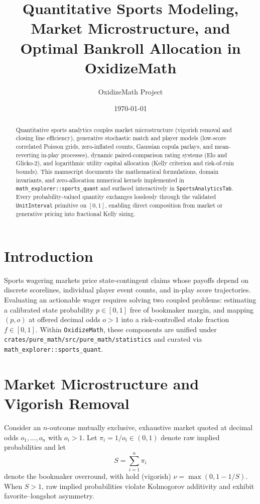 \documentclass{article}
\title{Quantitative Sports Modeling, Market Microstructure, and Optimal Bankroll Allocation in OxidizeMath}
\author{OxidizeMath Project}
\date{\today}
\begin{document}
\maketitle

\begin{abstract}
Quantitative sports analytics couples market microstructure (vigorish removal and closing line efficiency), generative stochastic match and player models (low-score correlated Poisson grids, zero-inflated counts, Gaussian copula parlays, and mean-reverting in-play processes), dynamic paired-comparison rating systems (Elo and Glicko-2), and logarithmic utility capital allocation (Kelly criterion and risk-of-ruin bounds). This manuscript documents the mathematical formulations, domain invariants, and zero-allocation numerical kernels implemented in \texttt{math\_explorer::sports\_quant} and surfaced interactively in \texttt{SportsAnalyticsTab}. Every probability-valued quantity exchanges losslessly through the validated \texttt{UnitInterval} primitive on $[0, 1]$, enabling direct composition from market or generative pricing into fractional Kelly sizing.
\end{abstract}

\section{Introduction}
Sports wagering markets price state-contingent claims whose payoffs depend on discrete scorelines, individual player event counts, and in-play score trajectories. Evaluating an actionable wager requires solving two coupled problems: estimating a calibrated state probability $p \in [0, 1]$ free of bookmaker margin, and mapping $(p, o)$ at offered decimal odds $o > 1$ into a risk-controlled stake fraction $f \in [0, 1]$. Within \texttt{OxidizeMath}, these components are unified under \texttt{crates/pure\_math/src/pure\_math/statistics} and curated via \texttt{math\_explorer::sports\_quant}.

\section{Market Microstructure and Vigorish Removal}
Consider an $n$-outcome mutually exclusive, exhaustive market quoted at decimal odds $o_1, \dots, o_n$ with $o_i > 1$. Let $\pi_i = 1 / o_i \in (0, 1)$ denote raw implied probabilities and let
\begin{equation}
S = \sum_{i=1}^{n} \pi_i
\end{equation}
denote the bookmaker overround, with hold (vigorish) $\nu = \max(0, 1 - 1 / S)$. When $S > 1$, raw implied probabilities violate Kolmogorov additivity and exhibit favorite--longshot asymmetry.
\end{document}
